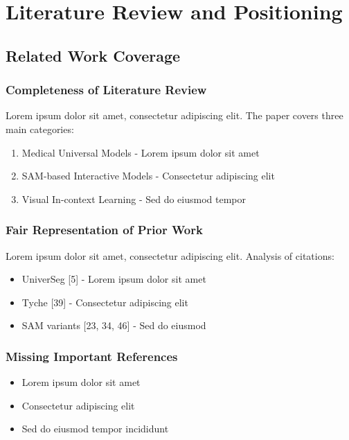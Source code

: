 \section{Literature Review and Positioning}
\label{sec:literature_review}

\subsection{Related Work Coverage}
\subsubsection{Completeness of Literature Review}
Lorem ipsum dolor sit amet, consectetur adipiscing elit. The paper covers three main categories:
\begin{enumerate}
    \item Medical Universal Models - Lorem ipsum dolor sit amet
    \item SAM-based Interactive Models - Consectetur adipiscing elit
    \item Visual In-context Learning - Sed do eiusmod tempor
\end{enumerate}


\subsubsection{Fair Representation of Prior Work}
Lorem ipsum dolor sit amet, consectetur adipiscing elit. Analysis of citations:
\begin{itemize}
    \item UniverSeg [5] - Lorem ipsum dolor sit amet
    \item Tyche [39] - Consectetur adipiscing elit
    \item SAM variants [23, 34, 46] - Sed do eiusmod
\end{itemize}

\subsubsection{Missing Important References}
\begin{itemize}
    \item Lorem ipsum dolor sit amet
    \item Consectetur adipiscing elit
    \item Sed do eiusmod tempor incididunt
\end{itemize}

